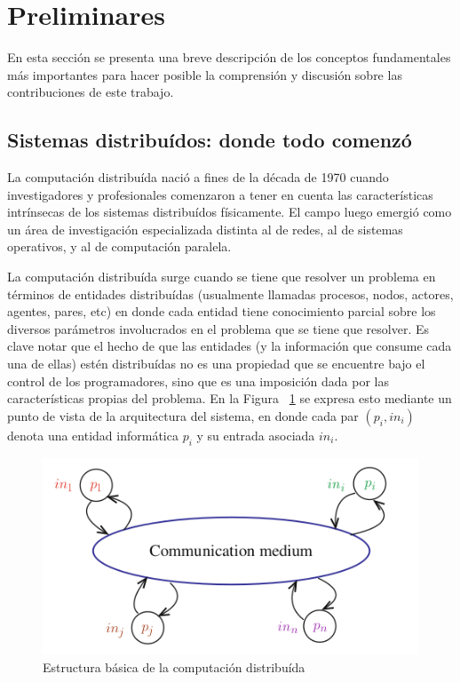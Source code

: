 \section{Preliminares}\label{sec:prelim}


En esta sección se presenta una breve descripción de los conceptos fundamentales
más importantes para hacer posible la comprensión y discusión sobre las
contribuciones de este trabajo.

\subsection{Sistemas distribuídos: donde todo comenzó}

La computación distribuída nació a fines de la década de 1970 cuando investigadores y profesionales
comenzaron a tener en cuenta las características intrínsecas de los sistemas distribuídos físicamente.
El campo luego emergió como un área de investigación especializada distinta al de redes, al de sistemas
operativos, y al de computación paralela.~\cite{raynal.dist.systems}

La computación distribuída surge cuando se tiene que resolver un problema en términos de entidades
distribuídas (usualmente llamadas procesos, nodos, actores, agentes, pares, etc) en donde cada
entidad tiene conocimiento parcial sobre los diversos parámetros involucrados en el problema que
se tiene que resolver. 
Es clave notar que el hecho de que las entidades (y la información que consume cada una de ellas)
estén distribuídas no es una propiedad que se encuentre bajo el control de los programadores, sino 
que es una imposición dada por las características propias del problema. En la 
Figura ~\ref{fig:distributed-systems} se expresa esto mediante un punto de vista
de la arquitectura del sistema, en donde cada par $(p_i, in_i)$ denota una entidad informática $p_i$ y su
entrada asociada $in_i$.

\begin{figure}
  \centering
  \includegraphics[scale=0.5]{figures/distributed-systems.png}
  \caption{Estructura básica de la computación distribuída}
  \label{fig:distributed-systems}
\end{figure}


